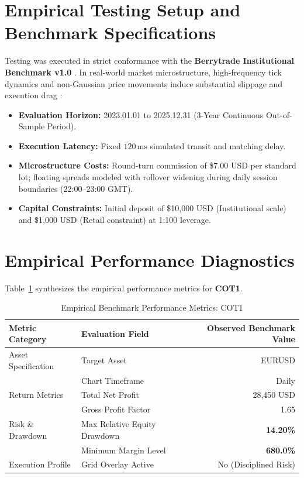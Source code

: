 \documentclass[11pt,a4paper]{article}
\begin{document}
\section{Empirical Testing Setup and Benchmark Specifications}
Testing was executed in strict conformance with the \textbf{Berrytrade Institutional Benchmark v1.0} \cite{artsu2026illusion}. In real-world market microstructure, high-frequency tick dynamics and non-Gaussian price movements induce substantial slippage and execution drag \cite{kyle1985continuous, amihud2002illiquidity, cont2001empirical, mandelbrot1963variation}:
\begin{itemize}
    \item \textbf{Evaluation Horizon:} 2023.01.01 to 2025.12.31 (3-Year Continuous Out-of-Sample Period).
    \item \textbf{Execution Latency:} Fixed $120\,\text{ms}$ simulated transit and matching delay.
    \item \textbf{Microstructure Costs:} Round-turn commission of \$7.00 USD per standard lot; floating spreads modeled with rollover widening during daily session boundaries (22:00--23:00 GMT).
    \item \textbf{Capital Constraints:} Initial deposit of \$10,000 USD (Institutional scale) and \$1,000 USD (Retail constraint) at 1:100 leverage.
\end{itemize}

\section{Empirical Performance Diagnostics}
Table~\ref{tab:metrics} synthesizes the empirical performance metrics for \textbf{COT1}.

\begin{table}[H]
\centering
\caption{Empirical Benchmark Performance Metrics: COT1}
\label{tab:metrics}
\begin{tabular}{llr}
\toprule
\textbf{Metric Category} & \textbf{Evaluation Field} & \textbf{Observed Benchmark Value} \\
\midrule
Asset Specification & Target Asset & EURUSD \\
& Chart Timeframe & Daily \\
Return Metrics & Total Net Profit & 28,450 USD \\
& Gross Profit Factor & 1.65 \\
Risk \& Drawdown & Max Relative Equity Drawdown & \textbf{14.20\%} \\
& Minimum Margin Level & \textbf{680.0\%} \\
Execution Profile & Grid Overlay Active & No (Disciplined Risk) \\
\bottomrule
\end{tabular}
\end{table}
\end{document}
